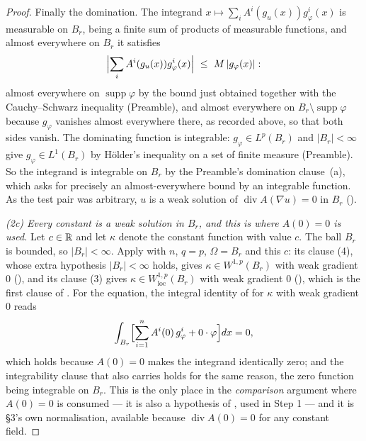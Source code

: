 \begin{proof}
Finally the domination.  The integrand
$x\mapsto\sum_iA^i(g_u(x))g_\varphi^i(x)$ is measurable on $B_r$, being a finite
sum of products of measurable functions, and almost everywhere on $B_r$ it
satisfies
\[
\Bigl|\sum_iA^i(g_u(x))g_\varphi^i(x)\Bigr|\ \le\ M\,|g_\varphi(x)| :
\]
almost everywhere on $\operatorname{supp}\varphi$ by the bound just obtained
together with the Cauchy--Schwarz inequality (Preamble), and almost everywhere
on $B_r\setminus\operatorname{supp}\varphi$ because $g_\varphi$ vanishes almost
everywhere there, as recorded above, so that both sides vanish.  The dominating
function is integrable: $g_\varphi\in L^p(B_r)$ and $|B_r|<\infty$ give
$g_\varphi\in L^1(B_r)$ by H\"older's inequality on a set of finite measure
(Preamble).  So the integrand is integrable on $B_r$ by the Preamble's
domination clause~(a), which asks for precisely an almost-everywhere bound by an
integrable function.  As
the test pair was arbitrary, $u$ is a weak
solution of $\operatorname{div}A(\nabla u)=0$ in $B_r$
().

\emph{(2c) Every constant is a weak solution in $B_r$, and this is where
$A(0)=0$ is used.}  Let $c\in\mathbb{R}$ and let $\kappa$ denote the constant function
with value $c$.  The ball $B_r$ is bounded, so $|B_r|<\infty$.  Apply
 with $n$, $q=p$, $\Omega=B_r$ and this $c$: its
clause (4), whose extra hypothesis $|B_r|<\infty$ holds, gives
$\kappa\in W^{1,p}(B_r)$ with weak gradient $0$ (), and its
clause (3) gives $\kappa\in W^{1,p}_{\mathrm{loc}}(B_r)$ with weak gradient $0$
(), which is the first clause of
.  For the equation, the integral identity of
 for $\kappa$ with weak gradient $0$ reads
\[
\int_{B_r}\Bigl[\sum_{i=1}^nA^i(0)\,g_\varphi^i+0\cdot\varphi\Bigr]dx=0 ,
\]
which holds because $A(0)=0$ makes the integrand identically zero; and the
integrability clause that  also carries holds for the
same reason, the zero function being integrable on $B_r$.  This is the
only place in the \emph{comparison} argument where $A(0)=0$ is consumed --- it is
also a hypothesis of , used in Step 1 --- and it is
\S3's own normalisation, available because $\operatorname{div}A(0)=0$ for any
constant field.


\end{proof}

